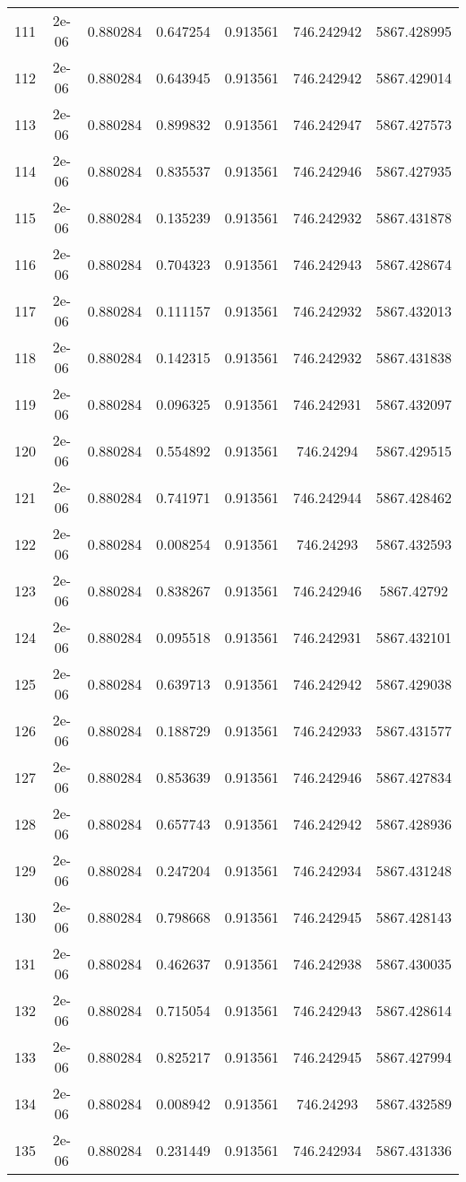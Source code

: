 \begin{table}
\begin{tabular*}{\linewidth}{c|c|c|c|c|c|c}
111 & 2e-06 & 0.880284 & 0.647254 & 0.913561 & 746.242942 & 5867.428995\\
112 & 2e-06 & 0.880284 & 0.643945 & 0.913561 & 746.242942 & 5867.429014\\
113 & 2e-06 & 0.880284 & 0.899832 & 0.913561 & 746.242947 & 5867.427573\\
114 & 2e-06 & 0.880284 & 0.835537 & 0.913561 & 746.242946 & 5867.427935\\
115 & 2e-06 & 0.880284 & 0.135239 & 0.913561 & 746.242932 & 5867.431878\\
116 & 2e-06 & 0.880284 & 0.704323 & 0.913561 & 746.242943 & 5867.428674\\
117 & 2e-06 & 0.880284 & 0.111157 & 0.913561 & 746.242932 & 5867.432013\\
118 & 2e-06 & 0.880284 & 0.142315 & 0.913561 & 746.242932 & 5867.431838\\
119 & 2e-06 & 0.880284 & 0.096325 & 0.913561 & 746.242931 & 5867.432097\\
120 & 2e-06 & 0.880284 & 0.554892 & 0.913561 & 746.24294 & 5867.429515\\
121 & 2e-06 & 0.880284 & 0.741971 & 0.913561 & 746.242944 & 5867.428462\\
122 & 2e-06 & 0.880284 & 0.008254 & 0.913561 & 746.24293 & 5867.432593\\
123 & 2e-06 & 0.880284 & 0.838267 & 0.913561 & 746.242946 & 5867.42792\\
124 & 2e-06 & 0.880284 & 0.095518 & 0.913561 & 746.242931 & 5867.432101\\
125 & 2e-06 & 0.880284 & 0.639713 & 0.913561 & 746.242942 & 5867.429038\\
126 & 2e-06 & 0.880284 & 0.188729 & 0.913561 & 746.242933 & 5867.431577\\
127 & 2e-06 & 0.880284 & 0.853639 & 0.913561 & 746.242946 & 5867.427834\\
128 & 2e-06 & 0.880284 & 0.657743 & 0.913561 & 746.242942 & 5867.428936\\
129 & 2e-06 & 0.880284 & 0.247204 & 0.913561 & 746.242934 & 5867.431248\\
130 & 2e-06 & 0.880284 & 0.798668 & 0.913561 & 746.242945 & 5867.428143\\
131 & 2e-06 & 0.880284 & 0.462637 & 0.913561 & 746.242938 & 5867.430035\\
132 & 2e-06 & 0.880284 & 0.715054 & 0.913561 & 746.242943 & 5867.428614\\
133 & 2e-06 & 0.880284 & 0.825217 & 0.913561 & 746.242945 & 5867.427994\\
134 & 2e-06 & 0.880284 & 0.008942 & 0.913561 & 746.24293 & 5867.432589\\
135 & 2e-06 & 0.880284 & 0.231449 & 0.913561 & 746.242934 & 5867.431336\\
\end{tabular*}
\end{table}

